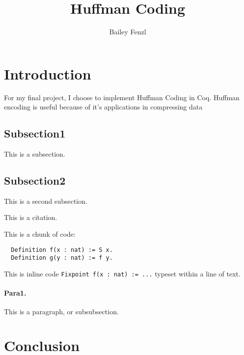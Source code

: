 \documentclass{llncs}
\begin{document}
\title{Huffman Coding}

\author{Bailey Fenzl}

\maketitle

\section{Introduction}

For my final project, I choose to implement Huffman Coding in Coq. Huffman encoding is useful because of it's applications in compressing data 

\subsection{Subsection1} This is a subsection.

\subsection{Subsection2} This is a second subsection.

This is a citation.~\cite{gennaro2010non}

This is a chunk of code:
\begin{lstlisting}
  Definition f(x : nat) := S x.
  Definition g(y : nat) := f y.
\end{lstlisting}

This is inline code \lstinline|Fixpoint f(x : nat) := ...| typeset within a line of text.

\paragraph{Para1.} This is a paragraph, or subsubsection.

\section{Conclusion}



\end{document}
